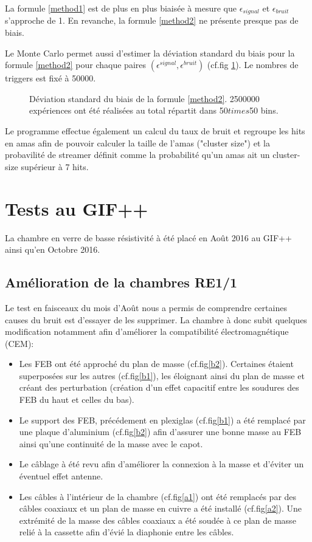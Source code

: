 La formule \ref{method1} est de plus en plus biaisée à mesure que $\epsilon_{signal}$ et $\epsilon_{bruit}$ s'approche de \num {1}. En revanche, la formule \ref{method2} ne présente presque pas de biais.

Le Monte Carlo permet aussi d'estimer la déviation standard du biais pour la formule \ref{method2} pour chaque paires $\left(\epsilon^{signal},\epsilon^{bruit}\right)$ (cf.fig \ref{RMSmethod2}). Le nombres de triggers est fixé à \num{50000}.

\begin{figure}
	\centering
	\scalebox{0.75}{}
	\caption{Déviation standard du biais de la formule \ref{method2}. \num{2500000} expériences ont été réalisées au total répartit dans \num{50}$times$\num{50} bins.}
	\label{RMSmethod2}
\end{figure}
\tikzexternalenable

Le programme effectue également un calcul du taux de bruit et regroupe les hits en amas afin de pouvoir calculer la taille de l'amas ("cluster size") et la probavilité de streamer définit comme la probabilité qu'un amas ait un cluster-size supérieur à 7 hits.

\section{Tests au GIF++}
La chambre en verre de basse résistivité à été placé en Août 2016 au GIF++ ainsi qu'en Octobre 2016.

\subsection{Amélioration de la chambres RE1/1}
Le test en faisceaux du mois d'Août nous a permis de comprendre certaines causes du bruit est d'essayer de les supprimer.
La chambre à donc subit quelques modification notamment afin d'améliorer la compatibilité électromagnétique (CEM):

\begin{itemize}[label=$\bullet$]
	\item Les FEB ont été approché du plan de masse (cf.fig\ref{b2}). Certaines étaient superposées sur les autres (cf.fig\ref{b1}), les éloignant ainsi du plan de masse et créant des perturbation (création d'un effet capacitif entre les soudures des FEB du haut et celles du bas).
	\item Le support des FEB, précédement en plexiglas (cf.fig\ref{b1}) a été remplacé par une plaque d'aluminium (cf.fig\ref{b2}) afin d'assurer une bonne masse au FEB ainsi qu'une continuité de la masse avec le capot.
	\item Le câblage à été revu afin d'améliorer la connexion à la masse et d'éviter un éventuel effet antenne.
	\item Les câbles à l'intérieur de la chambre (cf.fig\ref{a1}) ont été remplacés par des câbles coaxiaux et un plan de masse en cuivre a été installé (cf.fig\ref{a2}). Une extrémité de la masse des câbles coaxiaux a été soudée à ce plan de masse relié à la cassette afin d'évié la diaphonie entre les câbles.
\end{itemize}



